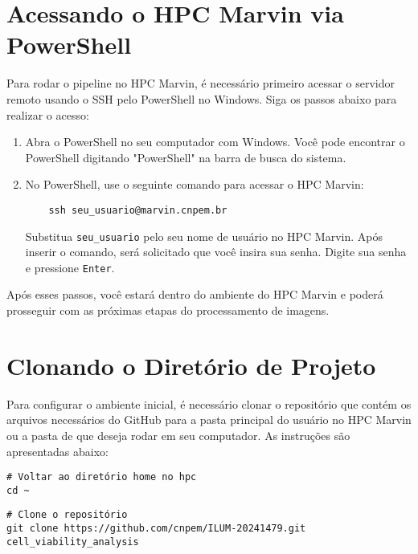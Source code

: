 \documentclass[a4paper, 12pt]{article}
\begin{document}
\section{Acessando o HPC Marvin via PowerShell}


Para rodar o pipeline no HPC Marvin, é necessário primeiro acessar o servidor remoto usando o SSH pelo PowerShell no Windows. Siga os passos abaixo para realizar o acesso:


\begin{enumerate}
    \item Abra o PowerShell no seu computador com Windows. Você pode encontrar o PowerShell digitando "PowerShell" na barra de busca do sistema.
    \item No PowerShell, use o seguinte comando para acessar o HPC Marvin:
    
    \begin{verbatim}
    ssh seu_usuario@marvin.cnpem.br
    \end{verbatim}
    
    Substitua \texttt{seu\_usuario} pelo seu nome de usuário no HPC Marvin. Após inserir o comando, será solicitado que você insira sua senha. Digite sua senha e pressione \texttt{Enter}.
\end{enumerate}

Após esses passos, você estará dentro do ambiente do HPC Marvin e poderá prosseguir com as próximas etapas do processamento de imagens.



\section{Clonando o Diretório de Projeto}

Para configurar o ambiente inicial, é necessário clonar o repositório que contém os arquivos necessários do GitHub para a pasta principal do usuário no HPC Marvin ou a pasta de que deseja rodar em seu computador. As instruções são apresentadas abaixo:

\begin{verbatim}
# Voltar ao diretório home no hpc
cd ~
\end{verbatim}

\begin{verbatim}
# Clone o repositório
git clone https://github.com/cnpem/ILUM-20241479.git cell_viability_analysis
\end{verbatim}
\end{document}
